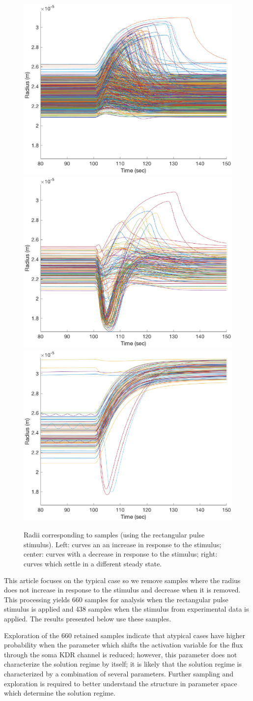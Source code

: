 \begin{figure}[h]
\centering
\includegraphics[width=.3 \textwidth]{Figures/Increase_with_Stim_Curves.eps}
\includegraphics[width=.3 \textwidth]{Figures/Decrease_with_Stim_Curves.eps}
\includegraphics[width=.3 \textwidth]{Figures/Higher_Steady_State.eps}
\caption{Radii corresponding to samples (using the rectangular pulse stimulus). Left: curves an an increase in response to the stimulus; center: curves with a decrease in response to the stimulus; right: curves which settle in a different steady state.}
\label{solution_regimes}
\end{figure}

This article focuses on the typical case so we remove samples where the radius does not increase in response to the stimulus and decrease when it is removed. This processing yields 660 samples for analysis when the rectangular pulse stimulus is applied and 438 samples when the stimulus from experimental data is applied. The results presented below use these samples.

Exploration of the 660 retained samples indicate that atypical cases have higher probability when the parameter which shifts the activation variable for the \pot flux through the soma KDR channel is reduced;
 however, this parameter does not characterize the solution regime by itself; it is likely that the solution regime is characterized by a combination of several parameters. Further sampling and exploration is required to better understand the structure in parameter space which determine the solution regime.

